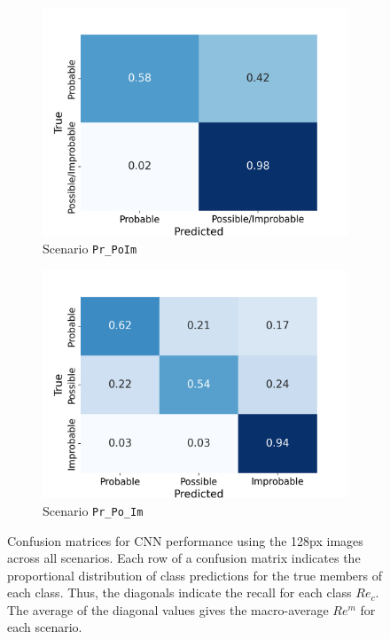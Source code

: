 \documentclass[Journal,letterpaper, SingleSpace, InsideFigs]{ascelike-new}
\begin{document}
\begin{figure}[ht]
  \begin{subfigure}[t]{.45\linewidth}
    \centering
    \includegraphics[width=\linewidth, trim={0 0 1cm 1cm}, clip]{opt-confusion-matrix-Pr_PoIm-128-px.png}
    \caption{Scenario \texttt{Pr\_PoIm}}
    \label{pr_poim_cm}
\end{subfigure}%
  \begin{subfigure}[t]{.45\linewidth}
    \centering
    \includegraphics[width=\linewidth, trim={0 0 1cm 1cm}, clip]{opt-confusion-matrix-Pr_Po_Im-128-px.png}
    \caption{Scenario \texttt{Pr\_Po\_Im}}
    \label{pr_po_im_cm}
  \end{subfigure}%
    \caption{Confusion matrices for CNN performance using the 128px images across all scenarios.
    Each row of a confusion matrix indicates the proportional distribution of class predictions for the true members of each class. Thus, the diagonals indicate the recall for each class $Re_c$. The average of the diagonal values gives the macro-average $Re^m$ for each scenario.}
    \label{fig:confusion-matrix}
  \end{figure}
\end{document}
